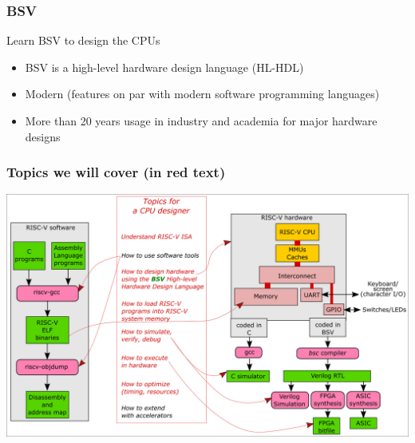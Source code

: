 
\begin{frame}
\frametitle{BSV}

Learn BSV to design the CPUs

\begin{itemize}

 \item BSV is a high-level hardware design language (HL-HDL)

 \item Modern (features on par with modern software programming languages)

 \item More than 20 years usage in industry and academia for major hardware designs
\end{itemize}

\end{frame}


\begin{frame}
\frametitle{Topics we will cover (in red text)}

\begin{center}
\includegraphics[height=0.8\textheight]{../Figures/Fig_Topics}
\end{center}

\end{frame}



